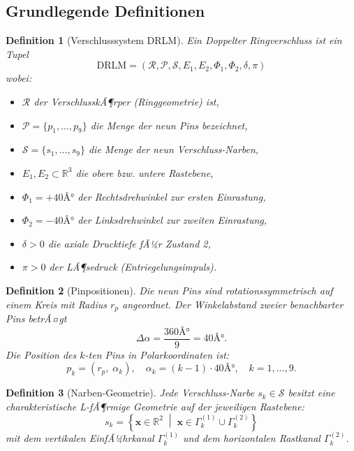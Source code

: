 ﻿\documentclass[12pt, a4paper]{article}
\newtheorem{definition}{Definition}[section]
\theoremstyle{remark}
\newcommand{\Pin}{\mathcal{P}}
\newcommand{\Scar}{\mathcal{S}}
\newcommand{\Ring}{\mathcal{R}}
\newcommand{\vvec}[1]{\boldsymbol{#1}}
\begin{document}
\subsection{Grundlegende Definitionen}

\begin{definition}[Verschlusssystem DRLM]
  Ein \emph{Doppelter Ringverschluss} ist ein Tupel
  \[
    \text{DRLM} = (\Ring, \Pin, \Scar, E_1, E_2, \Phi_1, \Phi_2, \delta, \pi)
  \]
  wobei:
  \begin{itemize}[noitemsep]
    \item $\Ring$ der VerschlusskÃ¶rper (Ringgeometrie) ist,
    \item $\Pin = \{p_1, \ldots, p_9\}$ die Menge der neun Pins bezeichnet,
    \item $\Scar = \{s_1, \ldots, s_9\}$ die Menge der neun Verschluss-Narben,
    \item $E_1, E_2 \subset \mathbb{R}^3$ die obere bzw. untere Rastebene,
    \item $\Phi_1 = +40Â°$ der Rechtsdrehwinkel zur ersten Einrastung,
    \item $\Phi_2 = -40Â°$ der Linksdrehwinkel zur zweiten Einrastung,
    \item $\delta > 0$ die axiale Drucktiefe fÃ¼r Zustand 2,
    \item $\pi > 0$ der LÃ¶sedruck (Entriegelungsimpuls).
  \end{itemize}
\end{definition}

\begin{definition}[Pinpositionen]
  Die neun Pins sind rotationssymmetrisch auf einem Kreis mit Radius $r_p$ angeordnet.
  Der Winkelabstand zweier benachbarter Pins betrÃ¤gt
  \[
    \Delta\alpha = \frac{360Â°}{9} = 40Â°.
  \]
  Die Position des $k$-ten Pins in Polarkoordinaten ist:
  \[
    p_k = \left(r_p,\; \alpha_k\right), \quad \alpha_k = (k-1) \cdot 40Â°, \quad k = 1, \ldots, 9.
  \]
\end{definition}

\begin{definition}[Narben-Geometrie]
  Jede Verschluss-Narbe $s_k \in \Scar$ besitzt eine charakteristische L-fÃ¶rmige Geometrie
  auf der jeweiligen Rastebene:
  \[
    s_k = \left\{ \vvec{x} \in \mathbb{R}^2 \;\middle|\; \vvec{x} \in \Gamma_k^{(1)} \cup \Gamma_k^{(2)} \right\}
  \]
  mit dem vertikalen EinfÃ¼hrkanal $\Gamma_k^{(1)}$ und dem horizontalen Rastkanal $\Gamma_k^{(2)}$.
\end{definition}
\end{document}
